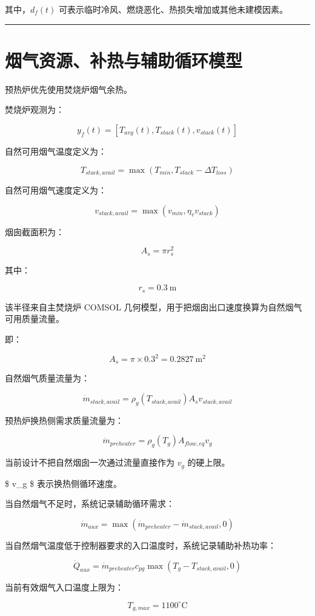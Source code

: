 \documentclass[UTF8,openany,zihao=-4,oneside]{ctexbook}
\newcommand{\manualdivider}{\par\vspace{0.6em}\noindent\textcolor{FGLine}{\rule{\linewidth}{0.7pt}}\vspace{0.6em}\par}
\begin{document}
其中，\(d_f(t)\) 可表示临时冷风、燃烧恶化、热损失增加或其他未建模因素。

\manualdivider

\section{烟气资源、补热与辅助循环模型}\label{ux70dfux6c14ux8d44ux6e90ux8865ux70edux4e0eux8f85ux52a9ux5faaux73afux6a21ux578b}

预热炉优先使用焚烧炉烟气余热。

焚烧炉观测为：

\[
y_f(t)=\left[T_{avg}(t),T_{stack}(t),v_{stack}(t)\right]
\]

自然可用烟气温度定义为：

\[
T_{stack,avail}=\max(T_{min},T_{stack}-\Delta T_{loss})
\]

自然可用烟气速度定义为：

\[
v_{stack,avail}=\max(v_{min},\eta_vv_{stack})
\]

烟囱截面积为：

\[
A_s=\pi r_s^2
\]

其中：

\[
r_s=0.3\ \mathrm{m}
\]

该半径来自主焚烧炉 COMSOL 几何模型，用于把烟囱出口速度换算为自然烟气可用质量流量。

即：

\[
A_s=\pi\times0.3^2=0.2827\ \mathrm{m^2}
\]

自然烟气质量流量为：

\[
\dot m_{stack,avail}=\rho_g(T_{stack,avail})A_sv_{stack,avail}
\]

预热炉换热侧需求质量流量为：

\[
\dot m_{preheater}=\rho_g(T_g)A_{flow,eq}v_g
\]

当前设计不把自然烟囱一次通过流量直接作为 \(v_g\) 的硬上限。

\$ v\_g \$ 表示换热侧循环速度。

当自然烟气不足时，系统记录辅助循环需求：

\[
\dot m_{aux}=\max(\dot m_{preheater}-\dot m_{stack,avail},0)
\]

当自然烟气温度低于控制器要求的入口温度时，系统记录辅助补热功率：

\[
\dot Q_{aux}=\dot m_{preheater}c_{pg}\max(T_g-T_{stack,avail},0)
\]

当前有效烟气入口温度上限为：

\[
T_{g,max}=1100^\circ\mathrm{C}
\]
\end{document}
